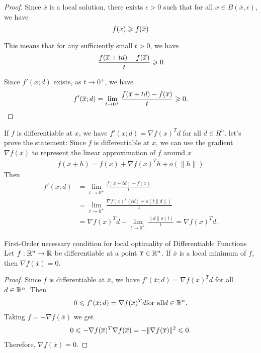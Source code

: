 \begin{proof}
Since $\overline{x}$ is a local solution, there exists $\epsilon > 0$ such that for all $x\in B(\overline{x},\epsilon)$, we have
\[
f(x) \geqslant f(\overline{x})
\]

This means that for any sufficiently small $t > 0$, we have
\[
\frac{f(\overline{x}+td) - f(\overline{x})}{t} \geqslant 0
\]

Since $f'(x;d)$ exists, as $t\to 0^+$, we have
\[
f'(\overline{x};d) = \lim_{t\to 0^+} \frac{f(\overline{x}+td) - f(\overline{x})}{t} \geqslant 0.
\]
\end{proof}

\begin{remark}
    If $f$ is differentiable at $x$, we have $f' (x; d)  = \nabla f(x)^Td$ for all $d \in R^n$.
    let's prove the statement: Since $f$ is differentiable at $x$, we can use the gradient $\nabla f(x)$ to represent the linear approximation of $f$ around $x$
    \begin{align*}
        f(x + h) = f(x) + \nabla f(x)^T h + o(\|h\|)
    \end{align*}
    Then 
    \begin{align*}
        f' (x; d) &= \lim_{t \to 0^+} \frac{f(x+td)-f(x)}{t} \\
                  &= \lim_{t\to 0^+}\frac{\nabla f(x)^T (td) + o(t\|d\|)}{t} \\
                  &= \nabla f(x)^Td + \lim_{t\to 0^+}\frac{\|d\|o(t)}{t} = \nabla f(x)^Td.
    \end{align*}
\end{remark}


\begin{theorem}{First-Order necessary condition for local optimality of Differentiable Functions}{}
    Let $f:\mathbb{R}^n\to \mathbb{R}$ be differentiable at a point $\overline{x}\in \mathbb{R}^n$. If $\overline{x}$ is a local minimum of $f$, 
    then $\nabla f(\overline{x})=0$.
\end{theorem}

\begin{proof}
    Since $f$ is differentiable at $\overline{x}$, we have $f'(\overline{x};d)=\nabla f(x)^Td$ for all $d\in \mathbb{R}^n$. Then 
    \begin{align*}
        0\leqslant f'(\overline{x};d)=\nabla f(\overline{x})^Td \text{for all} d\in \mathbb{R}^n.
    \end{align*}
    Taking $f=-\nabla f(\overline{x})$ we get 
    \begin{align*}
        0\leqslant -\nabla f(\overline{x})^T\nabla f(\overline{x})=-\|\nabla f(\overline{x})\|^2\leqslant 0.
    \end{align*}
    Therefore, $\nabla f(\overline{x})=0$.
\end{proof}


